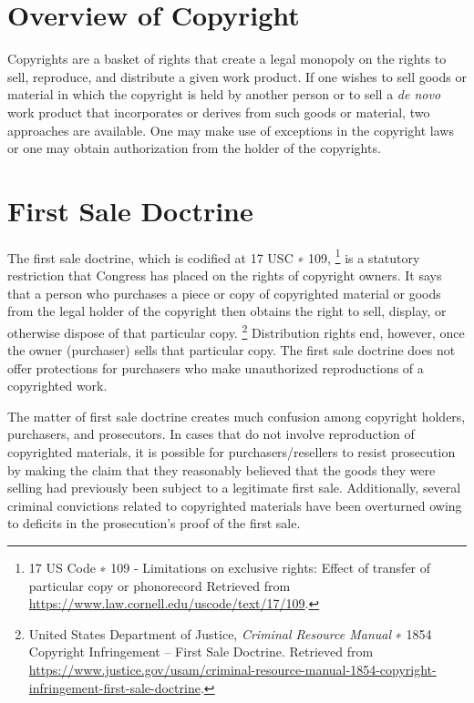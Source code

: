 \documentclass[letterpaper,11pt]{texMemo}
\begin{document}
\section*{Overview of Copyright}
  Copyrights are a basket of rights that create a legal monopoly on the rights to sell, reproduce, and distribute a given work product. If one wishes to sell goods or material in which the copyright is held by another person or to sell a \emph{de novo} work product that incorporates or derives from such goods or material, two approaches are available. One may make use of exceptions in the copyright laws or one may obtain authorization from the holder of the copyrights.
\section*{First Sale Doctrine}
  The first sale doctrine, which is codified at 17 USC \textsection∗ 109,
     \footnote{17 US Code \textsection∗ 109 - Limitations on exclusive rights: Effect of transfer of particular copy or phonorecord Retrieved from \href{https://www.law.cornell.edu/uscode/text/17/109}{https://www.law.cornell.edu/uscode/text/17/109}.
}
 is a statutory restriction that Congress has placed on the rights of copyright owners. It says that a person who purchases a piece or copy of copyrighted material or goods from the legal holder of the copyright then obtains the right to sell, display, or otherwise dispose of that particular copy.
     \footnote{United States Department of Justice, \emph{Criminal Resource Manual} \textsection∗ 1854 Copyright Infringement -- First Sale Doctrine. Retrieved from {\href{https://www.justice.gov/usam/criminal-resource-manual-1854-copyright-infringement-first-sale-doctrine}{https://www.justice.gov/usam/criminal-resource-manual-1854-copyright-infringement-first-sale-doctrine}}.
}
  Distribution rights end, however, once the owner (purchaser) sells that particular copy. The first sale doctrine does not offer protections for purchasers who make unauthorized reproductions of a copyrighted work.


  The matter of first sale doctrine creates much confusion among copyright holders, purchasers, and prosecutors. In cases that do not involve reproduction of copyrighted materials, it is possible for purchasers/resellers to resist prosecution by making the claim that they reasonably believed that the goods they were selling had previously been subject to a legitimate first sale. Additionally, several criminal convictions related to copyrighted materials have been overturned owing to deficits in the prosecution's proof of the first sale.
\end{document}
